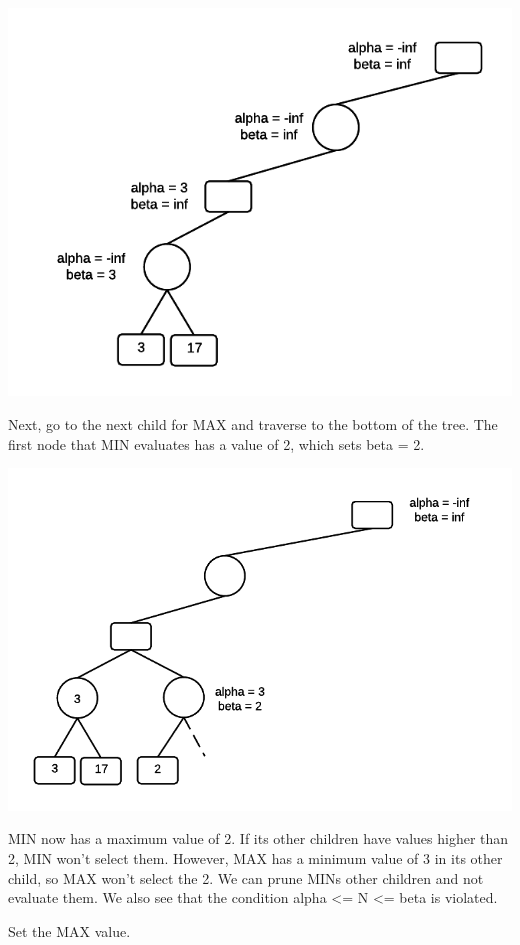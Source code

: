 \documentclass[12pt]{article}
\makeatletter
\def\maxwidth{\ifdim\Gin@nat@width>\linewidth\linewidth
    \else\Gin@nat@width\fi}
\let\Oldincludegraphics\includegraphics
\renewcommand{\includegraphics}[1]{\Oldincludegraphics[width=.8\maxwidth]{#1}}
\makeatother
\begin{document}
\includegraphics{img/ABExample3.png}

Next, go to the next child for MAX and traverse to the bottom of the
tree. The first node that MIN evaluates has a value of 2, which sets
beta = 2.

\includegraphics{img/ABExample4.png}

MIN now has a maximum value of 2. If its other children have values
higher than 2, MIN won't select them. However, MAX has a minimum value
of 3 in its other child, so MAX won't select the 2. We can prune MINs
other children and not evaluate them. We also see that the condition
alpha \textless{}= N \textless{}= beta is violated.

Set the MAX value.
\end{document}
